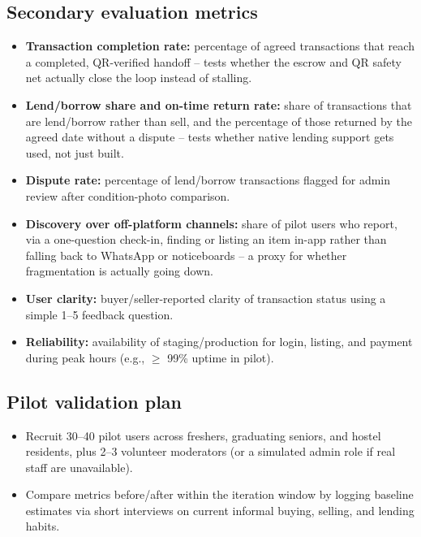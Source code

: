 \documentclass[11pt]{article}
\begin{document}
\subsection{Secondary evaluation metrics}
\begin{itemize}[leftmargin=*]
\item \textbf{Transaction completion rate:} percentage of agreed transactions that reach a completed, QR-verified handoff -- tests whether the escrow and QR safety net actually close the loop instead of stalling.
\item \textbf{Lend/borrow share and on-time return rate:} share of transactions that are lend/borrow rather than sell, and the percentage of those returned by the agreed date without a dispute -- tests whether native lending support gets used, not just built.
\item \textbf{Dispute rate:} percentage of lend/borrow transactions flagged for admin review after condition-photo comparison.
\item \textbf{Discovery over off-platform channels:} share of pilot users who report, via a one-question check-in, finding or listing an item in-app rather than falling back to WhatsApp or noticeboards -- a proxy for whether fragmentation is actually going down.
\item \textbf{User clarity:} buyer/seller-reported clarity of transaction status using a simple 1--5 feedback question.
\item \textbf{Reliability:} availability of staging/production for login, listing, and payment during peak hours (e.g., $\geq$ 99\% uptime in pilot).
\end{itemize}

\subsection{Pilot validation plan}
\begin{itemize}[leftmargin=*]
\item Recruit 30--40 pilot users across freshers, graduating seniors, and hostel residents, plus 2--3 volunteer moderators (or a simulated admin role if real staff are unavailable).
\item Compare metrics before/after within the iteration window by logging baseline estimates via short interviews on current informal buying, selling, and lending habits.
\end{itemize}
\end{document}
